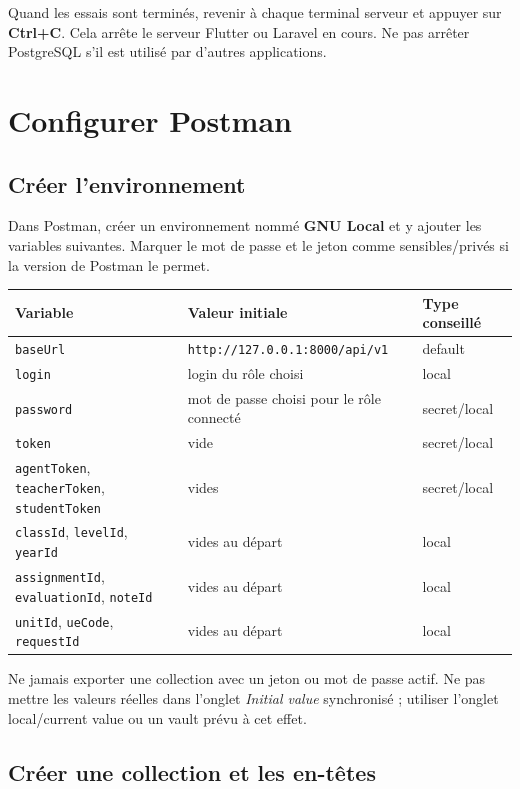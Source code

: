 \documentclass[10pt,a4paper]{article}
\begin{document}
Quand les essais sont terminés, revenir à chaque terminal serveur et appuyer sur \textbf{Ctrl+C}. Cela arrête le serveur Flutter ou Laravel en cours. Ne pas arrêter PostgreSQL s’il est utilisé par d’autres applications.

\section{Configurer Postman}

\subsection{Créer l’environnement}

Dans Postman, créer un environnement nommé \textbf{GNU Local} et y ajouter les variables suivantes. Marquer le mot de passe et le jeton comme sensibles/privés si la version de Postman le permet.

\begin{center}
\begin{tabularx}{\linewidth}{lXl}
\toprule
Variable & Valeur initiale & Type conseillé \\
\midrule
\texttt{baseUrl} & \texttt{http://127.0.0.1:8000/api/v1} & default \\
\texttt{login} & login du rôle choisi & local \\
\texttt{password} & mot de passe choisi pour le rôle connecté & secret/local \\
\texttt{token} & vide & secret/local \\
\texttt{agentToken}, \texttt{teacherToken}, \texttt{studentToken} & vides & secret/local \\
\texttt{classId}, \texttt{levelId}, \texttt{yearId} & vides au départ & local \\
\texttt{assignmentId}, \texttt{evaluationId}, \texttt{noteId} & vides au départ & local \\
\texttt{unitId}, \texttt{ueCode}, \texttt{requestId} & vides au départ & local \\
\bottomrule
\end{tabularx}
\end{center}

Ne jamais exporter une collection avec un jeton ou mot de passe actif. Ne pas mettre les valeurs réelles dans l’onglet \emph{Initial value} synchronisé ; utiliser l’onglet local/current value ou un vault prévu à cet effet.

\subsection{Créer une collection et les en-têtes}
\end{document}
